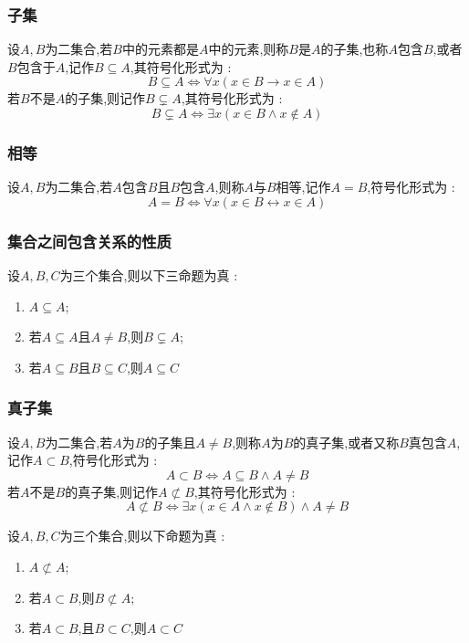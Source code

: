 \documentclass[UTF8,12pt]{ctexbook}
\DeclareMathOperator{\notRealSubset}{\not\subset}
\begin{document}
{{{{\subsubsection{子集}{
  设$A,B$为二集合,若$B$中的元素都是$A$中的元素,则称$B$是$A$的子集,也称$A$包含$B$,或者$B$包含于$A$,记作$B \subseteq A$,其符号化形式为 : $$
    B \subseteq A \Leftrightarrow \forall x (x \in B \to x \in A)
  $$
  若$B$不是$A$的子集,则记作$B \subsetneq A$,其符号化形式为 : $$
    B \subsetneq A \Leftrightarrow \exists x (x \in B \land x \notin A)
  $$
}%

\subsubsection{相等}{
  设$A,B$为二集合,若$A$包含$B$且$B$包含$A$,则称$A$与$B$相等,记作$A = B$,符号化形式为 : $$
    A = B \Leftrightarrow \forall x (x \in B \longleftrightarrow x \in A)
  $$
}%

\subsubsection{集合之间包含关系的性质}{
  设$A,B,C$为三个集合,则以下三命题为真 :

  \begin{enumerate}
    \item $A \subseteq A$;
    \item 若$A \subseteq A$且$A \neq B$,则$B \subsetneq A$;
    \item 若$A \subseteq B$且$B \subseteq C$,则$A \subseteq C$
  \end{enumerate}
}%

\subsubsection{真子集}{
  设$A,B$为二集合,若$A$为$B$的子集且$A \neq B$,则称$A$为$B$的真子集,或者又称$B$真包含$A$,记作$A \subset B$,符号化形式为 : $$
    A \subset B \Leftrightarrow A \subseteq B \land A \neq B
  $$
  若$A$不是$B$的真子集,则记作$A \notRealSubset B$,其符号化形式为 : $$
    A \notRealSubset B \Leftrightarrow \exists x (x \in A \land x \notin B) \land A \neq B
  $$

  设$A,B,C$为三个集合,则以下命题为真 :

  \begin{enumerate}
    \item $A \notRealSubset A$;
    \item 若$A \subset B$,则$B \notRealSubset A$;
    \item 若$A \subset B$,且$B \subset C$,则$A \subset C$
  \end{enumerate}
}%

}}}}
\end{document}
